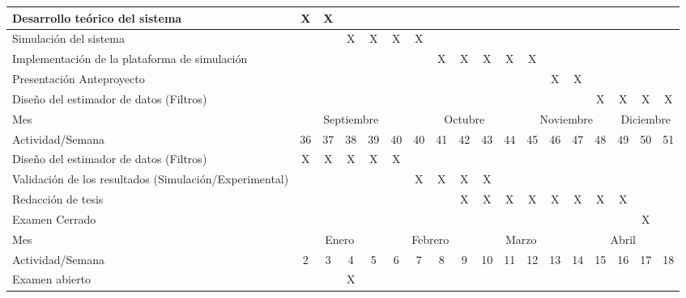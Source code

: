 \begin{table}[H]
{\begin{tabular}{|p{10cm}||c|c|c|c|c|c|c|c|c|c|c|c|c|c|c|c|c|}
		Desarrollo teórico del sistema & X & X &  &  &  &  &  &  &  &  &  & &  &  &   &  &  \\
			\hline
        Simulación del sistema &  &  & X & X & X & X &  &  &  &  &  &  &  &   &  &  & \\
			\hline	
            Implementación de la plataforma de simulación &  &  &  &  &  &  & X & X & X & X & X &  &  &   &  &  & \\
			\hline
			Presentación Anteproyecto &  &  & &  &  &  &  &  &  &  &  & X & X &   &  &  & \\
			\hline
			Diseño del estimador de datos (Filtros) &  &  &  &  &  &  &  &  & &  &  &  &  & X & X & X & X \\
			\hline
                        \hline
            Mes & \multicolumn{5}{|c|}{Septiembre} & \multicolumn{5}{|c|}{Octubre} & \multicolumn{4}{|c|}{Noviembre} & \multicolumn{3}{|c|}{Diciembre}\\
			\hline 
			Actividad/Semana  & 36 & 37 & 38 & 39 & 40 & 40 & 41 & 42 & 43 & 44 & 45 & 46 & 47 & 48 & 49 & 50 & 51 \\ 
			\hline
			Diseño del estimador de datos (Filtros) & X & X & X & X & X &  &  &  & &  &  &  &  & & & & \\
			\hline
            Validación de los resultados (Simulación/Experimental) &  &  &  &  &  & X & X & X & X &  &  &  &  &  &  &  & \\
			\hline
            Redacción de tesis &  &  &  &  &  &  &  & X & X & X & X & X & X & X & X &  &  \\
			\hline
			Examen Cerrado &  &  &  &  &  &  &  &  &  &  &  &  &  &  &  & X &  \\
			\hline
            Mes & \multicolumn{4}{|c|}{Enero} & \multicolumn{4}{|c|}{Febrero} & \multicolumn{4}{|c|}{Marzo} & \multicolumn{5}{|c|}{Abril} \\
            \hline
            Actividad/Semana & 2 & 3 & 4 & 5 & 6 & 7 & 8 & 9 & 10 & 11 & 12 & 13 & 14 & 15 & 16 & 17 & 18 \\
            \hline \hline
            Examen abierto &  &  & X & & & & & & & & & & & & & & \\
            \hline
			 \hline
		\end{tabular}
	}
	\label{actividades}
\end{table}

